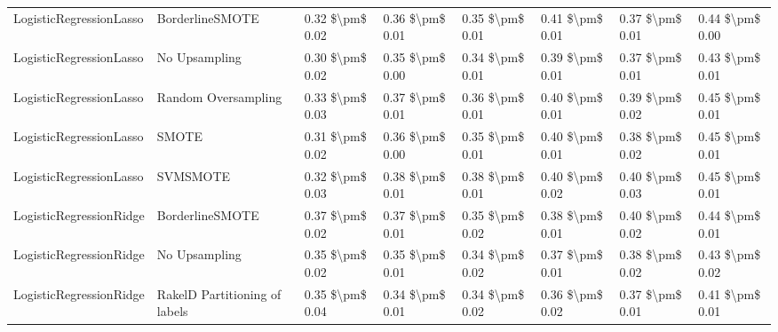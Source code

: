 \begin{tabular}{llllllll}
        LogisticRegressionLasso &               BorderlineSMOTE & 0.32 \$\textbackslash pm\$ 0.02 &           0.36 \$\textbackslash pm\$ 0.01 &       0.35 \$\textbackslash pm\$ 0.01 &        0.41 \$\textbackslash pm\$ 0.01 &                         0.37 \$\textbackslash pm\$ 0.01 &     0.44 \$\textbackslash pm\$ 0.00 \\
        LogisticRegressionLasso &                 No Upsampling & 0.30 \$\textbackslash pm\$ 0.02 &           0.35 \$\textbackslash pm\$ 0.00 &       0.34 \$\textbackslash pm\$ 0.01 &        0.39 \$\textbackslash pm\$ 0.01 &                         0.37 \$\textbackslash pm\$ 0.01 &     0.43 \$\textbackslash pm\$ 0.01 \\
        LogisticRegressionLasso &           Random Oversampling & 0.33 \$\textbackslash pm\$ 0.03 &           0.37 \$\textbackslash pm\$ 0.01 &       0.36 \$\textbackslash pm\$ 0.01 &        0.40 \$\textbackslash pm\$ 0.01 &                         0.39 \$\textbackslash pm\$ 0.02 &     0.45 \$\textbackslash pm\$ 0.01 \\
        LogisticRegressionLasso &                         SMOTE & 0.31 \$\textbackslash pm\$ 0.02 &           0.36 \$\textbackslash pm\$ 0.00 &       0.35 \$\textbackslash pm\$ 0.01 &        0.40 \$\textbackslash pm\$ 0.01 &                         0.38 \$\textbackslash pm\$ 0.02 &     0.45 \$\textbackslash pm\$ 0.01 \\
        LogisticRegressionLasso &                      SVMSMOTE & 0.32 \$\textbackslash pm\$ 0.03 &           0.38 \$\textbackslash pm\$ 0.01 &       0.38 \$\textbackslash pm\$ 0.01 &        0.40 \$\textbackslash pm\$ 0.02 &                         0.40 \$\textbackslash pm\$ 0.03 &     0.45 \$\textbackslash pm\$ 0.01 \\
        LogisticRegressionRidge &               BorderlineSMOTE & 0.37 \$\textbackslash pm\$ 0.02 &           0.37 \$\textbackslash pm\$ 0.01 &       0.35 \$\textbackslash pm\$ 0.02 &        0.38 \$\textbackslash pm\$ 0.01 &                         0.40 \$\textbackslash pm\$ 0.02 &     0.44 \$\textbackslash pm\$ 0.01 \\
        LogisticRegressionRidge &                 No Upsampling & 0.35 \$\textbackslash pm\$ 0.02 &           0.35 \$\textbackslash pm\$ 0.01 &       0.34 \$\textbackslash pm\$ 0.02 &        0.37 \$\textbackslash pm\$ 0.01 &                         0.38 \$\textbackslash pm\$ 0.02 &     0.43 \$\textbackslash pm\$ 0.02 \\
        LogisticRegressionRidge & RakelD Partitioning of labels & 0.35 \$\textbackslash pm\$ 0.04 &           0.34 \$\textbackslash pm\$ 0.01 &       0.34 \$\textbackslash pm\$ 0.02 &        0.36 \$\textbackslash pm\$ 0.02 &                         0.37 \$\textbackslash pm\$ 0.01 &     0.41 \$\textbackslash pm\$ 0.01 \\

\end{tabular}
